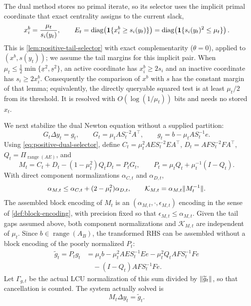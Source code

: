 The dual method stores no primal iterate, so its selector uses the implicit
primal coordinate that exact centrality assigns to the current slack,
\begin{equation}
 x_i^b=\frac{\mu_t}{s_i(y_t)},\qquad
 E_t=\operatorname{diag}\!\left({\bf1}\{x_i^b\geq s_i(y_t)\}\right)
    =\operatorname{diag}\!\left({\bf1}\{s_i(y_t)^2\leq\mu_t\}\right). \label{eq:positive-dual-selector}
\end{equation}
This is \cref{lem:positive-tail-selector} with exact complementarity
($\theta=0$), applied to $(x^b,s(y_t))$; we assume the tail margins for this
implicit pair.  When
$\mu_t\leq\frac12\min\{\underline x^2,\underline s^2\}$, an active coordinate
has $x_i^b\geq2s_i$ and an inactive coordinate has $s_i\geq2x_i^b$.
Consequently the comparison of $x^b$ with $s$ has the constant margin of
that lemma; equivalently, the directly queryable squared test is at least
$\mu_t/2$ from its threshold.  It is resolved with $O(\log(1/\mu_t))$ bits
and needs no stored $x_t$.

We next stabilize the dual Newton equation without a supplied partition:
\begin{equation}
 G_t\Delta y_t=g_t,\qquad
 G_t=\mu_tAS_t^{-2}A^\top,\qquad g_t=b-\mu_tAS_t^{-1}e.      \label{eq:positive-dual-newton}
\end{equation}
Using \eqref{eq:positive-dual-selector}, define
$C_t=\mu_t^2AES_t^{-2}EA^\top$, $D_t=AFS_t^{-2}FA^\top$,
$Q_t=\Pi_{\operatorname{range}(AE)}$, and
\begin{equation}
 M_t=C_t+D_t-(1-\mu_t^2)Q_tD_t=P_tG_t,\qquad
 P_t=\mu_tQ_t+\mu_t^{-1}(I-Q_t).                        \label{eq:positive-dual-stable}
\end{equation}
With direct component normalizations $\alpha_{C,t}$ and $\alpha_{D,t}$,
\begin{equation}
 \alpha_{M,t}\leq\alpha_{C,t}+(2-\mu_t^2)\alpha_{D,t},\qquad
 \mathcal K_{M,t}=\alpha_{M,t}\lVert M_t^{-1}\rVert.           \label{eq:positive-dual-normalization}
\end{equation}
The assembled block encoding of $M_t$ is an
$(\alpha_{M,t},\cdot,\epsilon_{M,t})$ encoding in the sense of
\cref{def:block-encoding}, with precision fixed so that
$\epsilon_{M,t}\le\alpha_{M,t}$.  Given the tail gaps assumed above, both
component normalizations and $\mathcal K_{M,t}$ are independent of $\mu_t$.
Since
$b\in\operatorname{range}(A_B)$, the transformed RHS can be assembled without
a block encoding of the poorly normalized $P_t$:
\begin{align}
 \widetilde g_t=P_tg_t
 &=\mu_tb-\mu_t^2AES_t^{-1}Ee-\mu_t^2Q_tAFS_t^{-1}Fe\nonumber\\
 &\quad-(I-Q_t)AFS_t^{-1}Fe.                            \label{eq:positive-transformed-rhs}
\end{align}
Let $\Gamma_{g,t}$ be the actual LCU normalization of this sum divided by
$\lVert\widetilde g_t\rVert$, so that cancellation is counted.  The system actually
solved is
\begin{equation}
 M_t\Delta y_t=\widetilde g_t.                            \label{eq:positive-transformed-system}
\end{equation}


